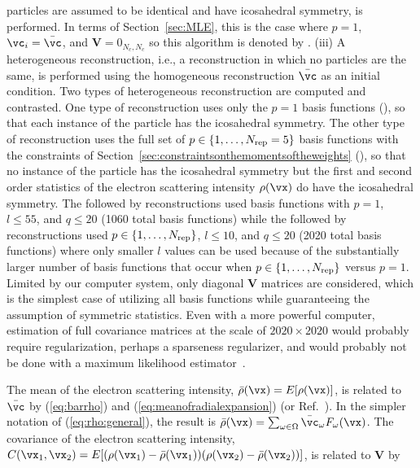 particles are assumed to be identical and have icosahedral symmetry, is
performed.
In terms of Section~\ref{sec:MLE}, this is the case where $p=1$,
$\vc_i=\bar\vc$, and $\mathbf{V}=0_{N_c,N_c}$ so this algorithm is denoted by
{\heterohomo}.
(iii) A heterogeneous reconstruction, i.e., a reconstruction in which no
particles are the same, is performed using the homogeneous reconstruction
$\bar\vc$ as an initial condition.
Two types of heterogeneous reconstruction are computed and contrasted.
One type of reconstruction uses only the $p=1$ basis functions
({\heterosymparticles}), so that each instance of the particle has the
icosahedral symmetry.
The other type of reconstruction uses the full set of
$p\in\{1,\dots,N_{\rm rep}=5\}$ basis functions with the constraints of
Section~\ref{sec:constraintsonthemomentsoftheweights}
({\heterosymstatistics}), so that no instance of the particle has the
icosahedral symmetry but the first and second order statistics of the
electron scattering intensity $\rho(\vx)$ do have the icosahedral
symmetry.
The {\heterohomo} followed by {\heterosymparticles} reconstructions used
basis functions with $p=1$, $l\le 55$, and $q\le 20$ (1060 total basis
functions) while the {\heterohomo} followed by {\heterosymstatistics}
reconstructions used $p\in\{1,\dots,N_{\rm rep}\}$, $l\le 10$, and $q\le 20$
(2020 total basis functions) where only smaller $l$ values can be used
because of the substantially larger number of basis functions that occur
when $p\in\{1,\dots,N_{\rm rep}\}$ versus $p=1$.
Limited by our computer system, only diagonal $\mathbf{V}$ matrices are
considered, which is the simplest case of utilizing all basis functions
while guaranteeing the assumption of symmetric statistics.
Even with a more powerful computer, estimation of full covariance matrices
at the scale of $2020\times 2020$ would probably require regularization,
perhaps a sparseness regularizer, and would probably not be done with a
maximum likelihood
estimator~\cite{WainwrightTibshiraniHastieStatisticalLearningWithSparsity2015}.
\par
The mean of the electron scattering intensity,
$\bar\rho(\vx)=E[\rho(\vx)]$, is related to $\bar{\vc}$ by
(\ref{eq:barrho}) and (\ref{eq:meanofradialexpansion})
(or Ref.~\cite[Eq.~16]{YiliZhengQiuWangDoerschukJOSA2012}).
In the simpler notation of (\ref{eq:rho:general}), the result is
$\bar\rho(\vx)=\sum_{\omega\in\Omega} \bar{\vc}_\omega F_\omega(\vx)$.
The covariance of the electron scattering intensity,
$\CrhoREAL(\vx_1,\vx_2)=E[(\rho(\vx_1)-\bar\rho(\vx_1))(\rho(\vx_2)-\bar\rho(\vx_2))]$,
is related to $\mathbf{V}$ by
